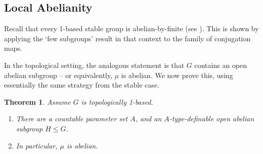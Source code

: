 \documentclass{amsart}
\newtheorem{theorem}{Theorem}[section]
\theoremstyle{definition}
\begin{document}
\subsection{Local Abelianity}

Recall that every 1-based stable group is abelian-by-finite (see \cite[Theorem 3.2]{HrPi87}). This is shown by applying the `few subgroups' result in that context to the family of conjugation maps.

In the topological setting, the analogous statement is that $G$ contains an open abelian subgroup -- or equivalently, $\mu$ is abelian. We now prove this, using essentially the same strategy from the stable case.

\begin{theorem}\label{T: local abelian} Assume $G$ is topologically 1-based.
\begin{enumerate}
    \item There are a countable parameter set $A$, and an $A$-type-definable open abelian subgroup $H\leq G$.
    \item In particular, $\mu$ is abelian.
\end{enumerate}
\end{theorem}
\end{document}
